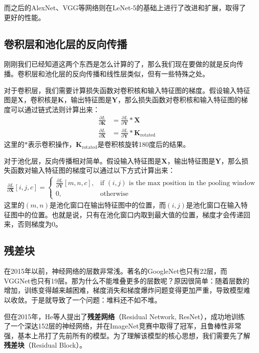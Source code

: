 而之后的AlexNet、VGG等网络则在LeNet-5的基础上进行了改进和扩展，取得了更好的性能。

\subsection{卷积层和池化层的反向传播}

刚刚我们已经知道这两个东西是怎么计算的了，那么我们现在要做的就是反向传播。卷积层和池化层的反向传播和线性层类似，但有一些特殊之处。

对于卷积层，我们需要计算损失函数对卷积核和输入特征图的梯度。假设输入特征图是$\mathbf{X}$，卷积核是$\mathbf{K}$，输出特征图是$\mathbf{Y}$，那么损失函数对卷积核和输入特征图的梯度可以通过链式法则计算出来：
\begin{align*}
\frac{\partial L}{\partial \mathbf{K}} &= \frac{\partial L}{\partial \mathbf{Y}} * \mathbf{X} \\
\frac{\partial L}{\partial \mathbf{X}} &= \frac{\partial L}{\partial \mathbf{Y}} * \mathbf{K}_{\text{rotated}}
\end{align*}
这里的$*$表示卷积操作，$\mathbf{K}_{\text{rotated}}$是卷积核旋转180度后的结果。

对于池化层，反向传播相对简单。假设输入特征图是$\mathbf{X}$，输出特征图是$\mathbf{Y}$，那么损失函数对输入特征图的梯度可以通过以下方式计算出来：
\begin{align*}
\frac{\partial L}{\partial \mathbf{X}}[i, j, c] = 
\begin{cases}
\frac{\partial L}{\partial \mathbf{Y}}[m, n, c], & \text{if } (i, j) \text{ is the max position in the pooling window} \\
0, & \text{otherwise}
\end{cases}
\end{align*}
这里的$(m, n)$是池化窗口在输出特征图中的位置，而$(i, j)$是池化窗口在输入特征图中的位置。也就是说，只有在池化窗口内取到最大值的位置，梯度才会传递回来，否则梯度为0。

\subsection{残差块}

在2015年以前，神经网络的层数非常浅。著名的GoogleNet也只有22层，而VGGNet也只有19层。那为什么不能堆叠更多的层数呢？原因很简单：随着层数的增加，训练变得越来越困难，梯度消失和梯度爆炸问题变得更加严重，导致模型难以收敛。于是就导致了一个问题：堆料还不如不堆。

但在2015年，He等人提出了\textbf{残差网络}（Residual Network, ResNet），成功地训练了一个深达152层的神经网络，并在ImageNet竞赛中取得了冠军，且鲁棒性非常强，基本上吊打了先前所有的模型。为了理解该模型的核心思想，我们需要先了解\textbf{残差块}（Residual Block）。

